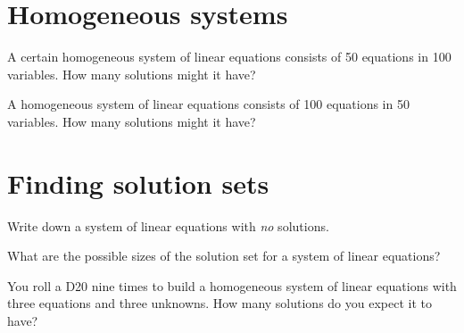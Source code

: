\documentclass{homework}
\begin{document}
\vfill

\section*{Homogeneous systems}

\begin{problem}
  A certain homogeneous system of linear equations consists of 50
  equations in 100 variables.  How many solutions might it have?
\end{problem}

\begin{problem}
  A homogeneous system of linear equations consists of 100 equations
  in 50 variables.  How many solutions might it have?
\end{problem}

\section*{Finding solution sets}

\begin{problem}
  Write down a system of linear equations with \textit{no} solutions.
\end{problem}

\begin{problem}
  What are the possible sizes of the solution set for a system of linear
  equations?
\end{problem}

\begin{problem}
  You roll a D20 nine times to build a homogeneous system of linear
  equations with three equations and three unknowns.  How many
  solutions do you expect it to have?
\end{problem}
\end{document}

